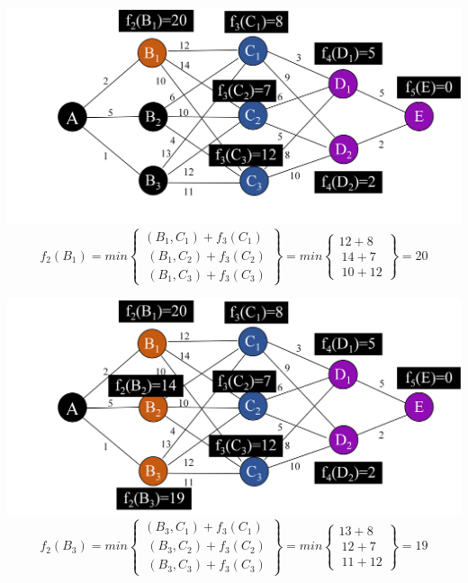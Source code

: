 \begin{frame}
    \includegraphics[width=\textwidth]{fig/dp6.png}
    $$f_2(B_1)=min \begin{Bmatrix}(B_1,C_1)+f_3(C_1)\\\ (B_1,C_2)+f_3(C_2)\\\ (B_1,C_3)+f_3(C_3) \end{Bmatrix} =min \begin{Bmatrix}12+8\\\ 14+7\\\ 10+12 \end{Bmatrix} =20$$
\end{frame}
\begin{frame}
    \includegraphics[width=\textwidth]{fig/dp7.png}
    $$f_2(B_3)=min \begin{Bmatrix}(B_3,C_1)+f_3(C_1)\\\ (B_3,C_2)+f_3(C_2)\\\ (B_3,C_3)+f_3(C_3) \end{Bmatrix} =min \begin{Bmatrix}13+8\\\ 12+7\\\ 11+12 \end{Bmatrix} =19$$
\end{frame}
